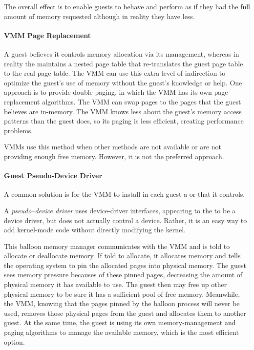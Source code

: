 The overall effect is to enable guests to behave and perform as if they had the full amount of memory requested although in reality they have less.

\paragraph{VMM Page Replacement}\label{par:VMM_Page_Replacement}
A guest believes it controls memory allocation via its  management, whereas in reality the  maintains a nested page table that re-translates the guest page table to the real page table.
The VMM can use this extra level of indirection to optimize the guest’s use of memory without the guest’s knowledge or help.
One approach is to provide double paging, in which the VMM has its own page-replacement algorithms.
The VMM can swap pages to the  pages that the guest believes are in-memory.
The VMM knows less about the guest's memory access patterns than the guest does, so its paging is less efficient, creating performance problems.

VMMs use this method when other methods are not available or are not providing enough free memory.
However, it is not the preferred approach.

\paragraph{Guest Pseudo-Device Driver}\label{par:VM_Mem_Kernel_Module}
A common solution is for the VMM to install in each guest a  or  that it controls.

\begin{definition}\label{def:Pseudo_Device_Driver}
  A \emph{pseudo–device driver} uses device-driver interfaces, appearing to the  to be a device driver, but does not actually control a device.
  Rather, it is an easy way to add kernel-mode code without directly modifying the kernel.
\end{definition}

This balloon memory manager communicates with the VMM and is told to allocate or deallocate memory.
If told to allocate, it allocates memory and tells the operating system to pin the allocated pages into physical memory.
The guest sees memory pressure becauses of these pinned pages, decreasing the amount of physical memory it has available to use.
The guest then may free up other physical memory to be sure it has a sufficient pool of free memory.
Meanwhile, the VMM, knowing that the pages pinned by the balloon process will never be used, removes those physical pages from the guest and allocates them to another guest.
At the same time, the guest is using its own memory-management and paging algorithms to manage the available memory, which is the most efficient option.

